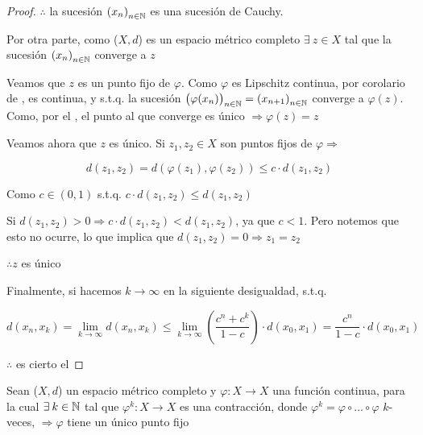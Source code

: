 \begin{proof}
    $\therefore$ la sucesión ${\left( x_n \right)}_{n \in \mathbb{N}}$ es una sucesión de Cauchy.

    Por otra parte, como ($X,d$) es un espacio métrico completo $\exists \: z \in X$ tal que la sucesión ${\left( x_n \right)}_{n \in \mathbb{N}}$ converge a $z$

    Veamos que $z$ es un punto fijo de $\varphi$. Como $\varphi$ es Lipschitz continua, por corolario de , es continua, y s.t.q. la sucesión ${\left( \varphi (x_n) \right)}_{n \in \mathbb{N}} = {\left( {x}_{n+1} \right)}_{n \in \mathbb{N}} $ converge a $\varphi(z)$. Como,  por el , el punto al que converge es único $\Rightarrow \varphi(z) = z$

    Veamos ahora que $z$ es único. Si $z_1, z_2 \in X$ son puntos fijos de $\varphi \Rightarrow$

    $$d(z_1, z_2) = d(\varphi(z_1), \varphi(z_2)) \leqslant c \cdot d(z_1, z_2)$$

    Como $c \in (0,1)$ s.t.q. $c \cdot d(z_1, z_2) \leqslant d(z_1, z_2)$

    Si $d(z_1, z_2) > 0 \Rightarrow c \cdot d(z_1, z_2)  < d(z_1, z_2)$, ya que $c < 1$. Pero notemos que esto no ocurre, lo que implica que $d(z_1, z_2) = 0 \Rightarrow z_1 = z_2$

    $\therefore z$ es único

    Finalmente, si hacemos $k \to \infty$ en la siguiente desigualdad, s.t.q.

    $$d(x_n,x_k) = \lim_{k \to \infty} d(x_n,x_k) \leqslant \lim_{k \to \infty} \left( \frac{c^n + c^k}{1-c} \right) \cdot d(x_0,x_1) = \frac{c^n}{1-c}  \cdot d(x_0,x_1) $$

    $\therefore$ es cierto el 
\end{proof}

\begin{corollary}
    Sean ($X,d$) un espacio métrico completo y $\varphi : X \to X$ una función continua, para la cual $\exists \: k \in \mathbb{N}$ tal que $\varphi^k : X \to X$ es una contracción, donde $\varphi^k = \varphi \circ ... \circ \varphi$ $k$-veces, $\Rightarrow \varphi$ tiene un único punto fijo
\end{corollary}

